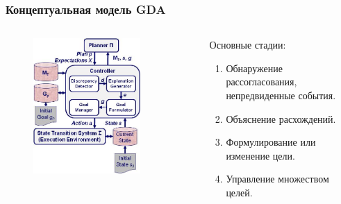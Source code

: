 \documentclass[default]{beamer}
\begin{document}
	\begin{frame}
		\frametitle{Концептуальная модель GDA}
		
		\begin{columns}
			\begin{column}{0.6\textwidth}
				\begin{figure}
					\includegraphics[width=0.8\textwidth]{gda_schema.jpg}
				\end{figure}
			\end{column}
			\begin{column}{0.4\textwidth}
				Основные стадии:
					\begin{enumerate}
						\item Обнаружение рассогласования, непредвиденные события.
						\item Объяснение расхождений.
						\item Формулирование или изменение цели.
						\item Управление множеством целей.
					\end{enumerate}
			\end{column}
		\end{columns}
	\end{frame}
	
\end{document}
